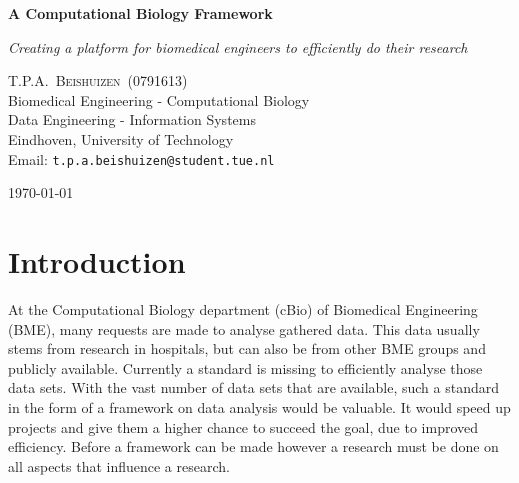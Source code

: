 \documentclass[10pt,a4paper]{article}
\newcommand{\documenttitle}{A Computational Biology Framework}
\newcommand{\documentsubtitle}{Creating a platform for biomedical engineers to efficiently do their research}
\begin{document}
	
	\begin{titlepage}
		
		\center
		
		\vspace*{3cm}
		
		\textbf{\huge \documenttitle}
		
		\textit{\LARGE \documentsubtitle}
		
		\vspace*{2cm}
		
		\large
		\centering
		T.P.A.~\textsc{Beishuizen}~(0791613)\\
		Biomedical Engineering - Computational Biology\\
		Data Engineering - Information Systems\\
		Eindhoven, University of Technology\\
		Email: \texttt{t.p.a.beishuizen@student.tue.nl}
		
		\vfill
		
		\vspace*{1cm}
		
		\today
		
	\end{titlepage}
	
	\tableofcontents
	
	
	\pagestyle{fancy}
	\fancyhead{} %
	\fancyfoot{} %
	\renewcommand{\headrulewidth}{0.4pt}
	\renewcommand{\footrulewidth}{0.4pt}
	
	\fancyhead[L]{\rightmark}
	\fancyfoot[C]{\thepage}
	
	
	\clearpage
	
	\section{Introduction}
	
	At the Computational Biology department (cBio) of Biomedical Engineering (BME), many requests are made to analyse gathered data. This data usually stems from research in hospitals, but can also be from other BME groups and publicly available. Currently a standard is missing to efficiently analyse those data sets. With the vast number of data sets that are available, such a standard in the form of a framework on data analysis would be valuable. It would speed up projects and give them a higher chance to succeed the goal, due to improved efficiency. Before a framework can be made however a research must be done on all aspects that influence a research.
	
\end{document}
